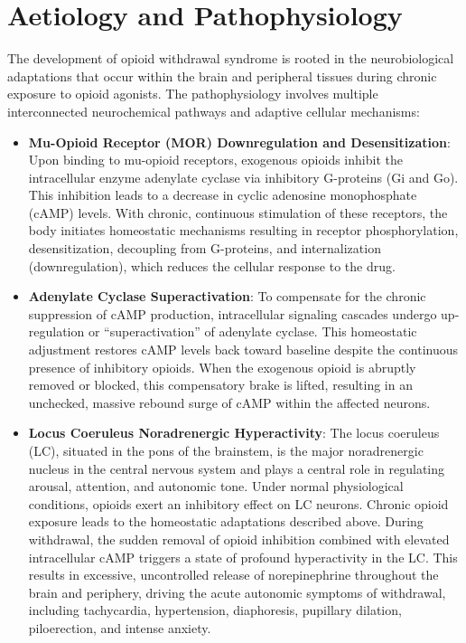 \section*{Aetiology and Pathophysiology}
The development of opioid withdrawal syndrome is rooted in the neurobiological adaptations that occur within the brain and peripheral tissues during chronic exposure to opioid agonists. The pathophysiology involves multiple interconnected neurochemical pathways and adaptive cellular mechanisms:
\begin{itemize}
    \item \textbf{Mu-Opioid Receptor (MOR) Downregulation and Desensitization}: Upon binding to mu-opioid receptors, exogenous opioids inhibit the intracellular enzyme adenylate cyclase via inhibitory G-proteins (Gi and Go). This inhibition leads to a decrease in cyclic adenosine monophosphate (cAMP) levels. With chronic, continuous stimulation of these receptors, the body initiates homeostatic mechanisms resulting in receptor phosphorylation, desensitization, decoupling from G-proteins, and internalization (downregulation), which reduces the cellular response to the drug.
    \item \textbf{Adenylate Cyclase Superactivation}: To compensate for the chronic suppression of cAMP production, intracellular signaling cascades undergo up-regulation or ``superactivation'' of adenylate cyclase. This homeostatic adjustment restores cAMP levels back toward baseline despite the continuous presence of inhibitory opioids. When the exogenous opioid is abruptly removed or blocked, this compensatory brake is lifted, resulting in an unchecked, massive rebound surge of cAMP within the affected neurons.
    \item \textbf{Locus Coeruleus Noradrenergic Hyperactivity}: The locus coeruleus (LC), situated in the pons of the brainstem, is the major noradrenergic nucleus in the central nervous system and plays a central role in regulating arousal, attention, and autonomic tone. Under normal physiological conditions, opioids exert an inhibitory effect on LC neurons. Chronic opioid exposure leads to the homeostatic adaptations described above. During withdrawal, the sudden removal of opioid inhibition combined with elevated intracellular cAMP triggers a state of profound hyperactivity in the LC. This results in excessive, uncontrolled release of norepinephrine throughout the brain and periphery, driving the acute autonomic symptoms of withdrawal, including tachycardia, hypertension, diaphoresis, pupillary dilation, piloerection, and intense anxiety.

\end{itemize}
